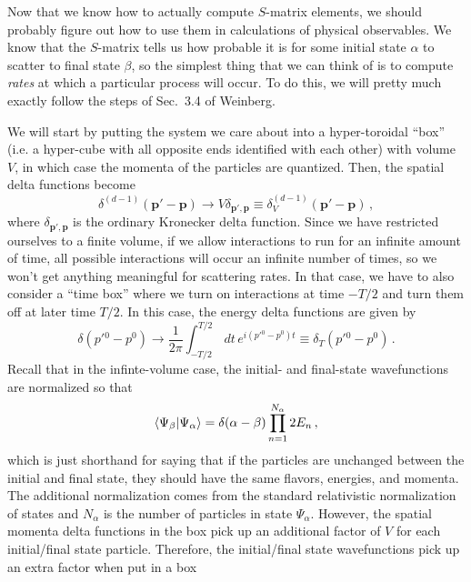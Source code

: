 \documentclass{article}
\numberwithin{equation}{subsection}
\begin{document}
Now that we know how to actually compute $S$-matrix elements, we should probably figure out how to use them in calculations of physical observables.
We know that the $S$-matrix tells us how probable it is for some initial state $\alpha$ to scatter to final state $\beta$, so the simplest thing that
we can think of is to compute \textit{rates} at which a particular process will occur. To do this, we will pretty much exactly follow the steps of Sec.~3.4
of Weinberg.

We will start by putting the system we care about into a hyper-toroidal ``box'' (i.e. a hyper-cube with all opposite ends identified with each other) with volume $V$, in which case
the momenta of the particles are quantized. Then, the spatial delta functions become
\begin{equation}
	\delta^{(d - 1)}(\mathbf{p}' - \mathbf{p}) \to V\delta_{\mathbf{p}',\mathbf{p}} \equiv \delta_V^{(d-1)}(\mathbf{p}' - \mathbf{p})\,,
\end{equation}
where $\delta_{\mathbf{p}',\mathbf{p}}$ is the ordinary Kronecker delta function. Since we have restricted ourselves to a finite volume, if we allow interactions
to run for an infinite amount of time, all possible interactions will occur an infinite number of times, so we won't get anything meaningful for scattering rates.
In that case, we have to also consider a ``time box'' where we turn on interactions at time $-T/2$ and turn them off at later time $T/2$. In this case, the
energy delta functions are given by
\begin{equation}
	\delta({p'}{}^0 - p^0) \to \frac{1}{2\pi}\int_{-T/2}^{T/2}\,dt\,e^{i({p'}{}^0 - p^0)t} \equiv \delta_T({p'}{}^0 - p^0)\,.
\end{equation}
Recall that in the infinte-volume case, the initial- and final-state wavefunctions are normalized so that
\begin{equation}
	\braket{\Psi_\beta}{\Psi_\alpha} = \delta(\alpha - \beta)\prod_{n=1}^{N_\alpha} 2E_n\,,
\end{equation}
which is just shorthand for saying that if the particles are unchanged between the initial and final state, they should have the same flavors, energies, and momenta.
The additional normalization comes from the standard relativistic normalization of states and $N_\alpha$ is the number of particles in state $\Psi_\alpha$.
However, the spatial momenta delta functions in the box pick up an additional factor of $V$ for each initial/final state particle. Therefore, the initial/final
state wavefunctions pick up an extra factor when put in a box
\end{document}
